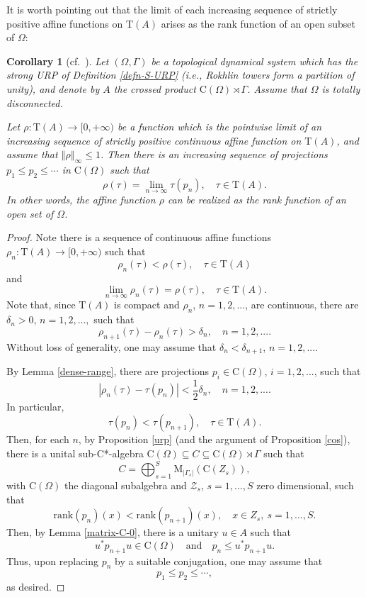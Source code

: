 \documentclass[12pt, oneside, psamsfonts]{amsart}
\newtheorem{cor}[thm]{Corollary}
\theoremstyle{definition}
\theoremstyle{remark}
\numberwithin{equation}{section}
\newcommand{\norm}[1]{\left\Vert#1\right\Vert}
\newcommand{\abs}[1]{\left\vert#1\right\vert}
\newcommand{\tr}{\mathrm{T}}
\begin{document}
It is worth pointing out that the limit of each increasing sequence of strictly positive affine functions on $\mathrm{T}(A)$ arises as the rank function of an open subset of $\Omega$:
\begin{cor}[cf.~\cite{Thiel-sr1}]
Let $(\Omega, \Gamma)$ be a topological dynamical system which has the strong URP of Definition \ref{defn-S-URP} (i.e., Rokhlin towers form a partition of unity), and denote by $A$ the crossed product $\mathrm{C}(\Omega) \rtimes \Gamma$. Assume that $\Omega$ is totally disconnected.

Let $ \rho: \mathrm{T}(A) \to [0, +\infty)$ be a function which is the pointwise limit of an increasing sequence of strictly positive continuous affine function on $\mathrm{T}(A)$, and assume that $\norm{\rho}_\infty \leq 1$. Then there is an increasing sequence of projections $p_1 \leq p_2 \leq \cdots$ in $\mathrm{C}(\Omega)$ such that 
$$ \rho(\tau) = \lim_{n \to\infty}\tau(p_n),\quad \tau \in \mathrm{T}(A). $$ In other words, the affine function $\rho$ can be realized as the rank function of an open set of $\Omega$.
\end{cor}

\begin{proof}
Note there is a sequence of continuous affine functions $\rho_n: \tr(A) \to [0,  +\infty)$ such that $$\rho_n(\tau) < \rho(\tau), \quad \tau \in \tr(A)$$ and $$ \lim_{n \to \infty} \rho_n(\tau) = \rho(\tau),\quad \tau \in \tr(A). $$ Note that, since $\tr(A)$ is compact and $\rho_n$, $n=1, 2, ...$, are continuous, there are $\delta_n>0$, $n=1, 2, ..., $ such that 
$$ \rho_{n+1}(\tau) - \rho_n(\tau) > \delta_n, \quad n=1, 2, ... .$$ Without loss of generality, one may assume that $\delta_n < \delta_{n+1}$, $n=1, 2, ...$. 


By Lemma \ref{dense-range}, there are projections $p_i \in \mathrm{C}(\Omega)$, $i=1, 2, ...$, such that
$$\abs{\rho_n(\tau) - \tau(p_n)} < \frac{1}{2}\delta_n,\quad n=1, 2, ... .$$ In particular, $$\tau(p_n) < \tau(p_{n+1}), \quad \tau \in \tr(A).$$
Then, for each $n$, by Proposition \ref{urp} (and the argument of Proposition \ref{cos}), there is a unital sub-C*-algebra $\mathrm{C}(\Omega) \subseteq C \subseteq \mathrm{C}(\Omega) \rtimes \Gamma$ such that
$$C = \bigoplus_{s = 1}^S \mathrm{M}_{\abs{\Gamma_s}}(\mathrm{C}(Z_s)),$$
with $\mathrm{C}(\Omega)$ the diagonal subalgebra and $\mathcal Z_s$, $s=1, ..., S$ zero dimensional, such that
$$\mathrm{rank}(p_n)(x) < \mathrm{rank}(p_{n+1})(x), \quad x \in Z_s,\ s=1, ..., S.$$
Then, by Lemma \ref{matrix-C-0}, there is a unitary $u \in A$ such that
$$u^*p_{n+1}u \in \mathrm{C}(\Omega) \quad \mathrm{and} \quad p_n \leq u^*p_{n+1}u.$$ Thus, upon replacing $p_n$ by a suitable conjugation, one may assume that $$p_1 \leq p_2 \leq \cdots,$$
as desired. 
\end{proof}
\end{document}
